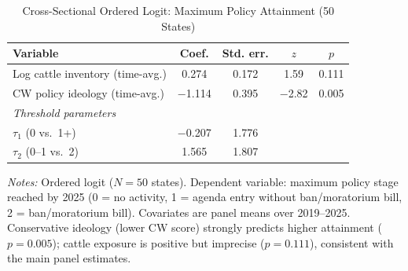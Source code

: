 \documentclass[12pt]{article}
\begin{document}
\begin{appendices}
\begin{table}[htbp]
\centering
\begin{threeparttable}
\caption{Cross-Sectional Ordered Logit: Maximum Policy Attainment (50 States)}
\label{tab:ordered_logit}
\small
\begin{tabular}{lcccc}
\toprule
Variable & Coef. & Std. err. & $z$ & $p$ \\
\midrule
Log cattle inventory (time-avg.)  & 0.274 & 0.172 & 1.59 & 0.111 \\
CW policy ideology (time-avg.)    & $-$1.114 & 0.395 & $-$2.82 & 0.005 \\
\midrule
\multicolumn{5}{l}{\textit{Threshold parameters}} \\
$\tau_1$ (0 vs.\ 1+)              & $-$0.207 & 1.776 & & \\
$\tau_2$ (0--1 vs.\ 2)            & 1.565  & 1.807 & & \\
\bottomrule
\end{tabular}
\begin{tablenotes}[flushleft]
\footnotesize
\item \textit{Notes:} Ordered logit ($N = 50$ states).  Dependent variable: maximum policy stage reached by 2025 (0 = no activity, 1 = agenda entry without ban/moratorium bill, 2 = ban/moratorium bill).  Covariates are panel means over 2019--2025.  Conservative ideology (lower CW score) strongly predicts higher attainment ($p = 0.005$); cattle exposure is positive but imprecise ($p = 0.111$), consistent with the main panel estimates.
\end{tablenotes}
\end{threeparttable}
\end{table}


\end{appendices}
\end{document}
